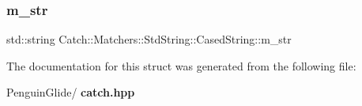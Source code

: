\mbox{\label{struct_catch_1_1_matchers_1_1_std_string_1_1_cased_string_ad05dbc99aba3c3c386d6b856b213f911}} 
\subsubsection{m\_str}
{\footnotesize\ttfamily std\+::string Catch\+::\+Matchers\+::\+Std\+String\+::\+Cased\+String\+::m\+\_\+str}



The documentation for this struct was generated from the following file\+:\begin{DoxyCompactItemize}
\item 
Penguin\+Glide/\textbf{ catch.\+hpp}\end{DoxyCompactItemize}
